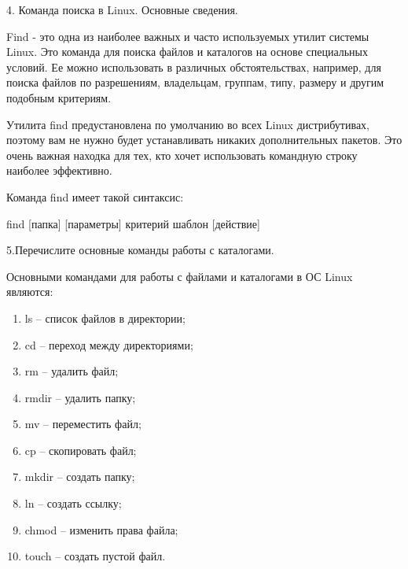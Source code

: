 4. Команда поиска в Linux. Основные сведения.

Find - это одна из наиболее важных и часто используемых утилит системы Linux. Это команда для поиска файлов и каталогов на основе специальных условий. Ее можно использовать в различных обстоятельствах, например, для поиска файлов по разрешениям, владельцам, группам, типу, размеру и другим подобным критериям.

Утилита find предустановлена по умолчанию во всех Linux дистрибутивах, поэтому вам не нужно будет устанавливать никаких дополнительных пакетов. Это очень важная находка для тех, кто хочет использовать командную строку наиболее эффективно.

Команда find имеет такой синтаксис:

find [папка] [параметры] критерий шаблон [действие]

5.Перечислите основные команды работы с каталогами.

Основными командами для работы с файлами и каталогами в ОС Linux являются:
\begin{enumerate}
    \item ls -- список файлов в директории;
    \item cd -- переход между директориями;
    \item rm -- удалить файл;
    \item rmdir -- удалить папку;
    \item mv -- переместить файл;
    \item cp -- скопировать файл;
    \item mkdir -- создать папку;
    \item ln -- создать ссылку;
    \item chmod -- изменить права файла;
    \item touch -- создать пустой файл.
\end{enumerate}
